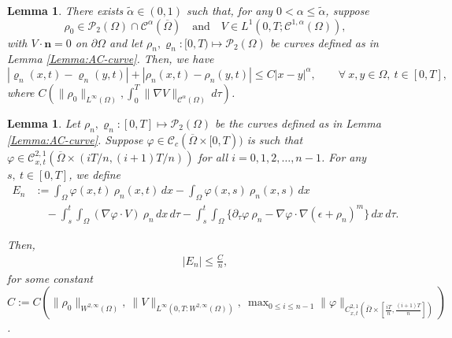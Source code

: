 \documentclass{amsart}
\newtheorem{lemma}[defn]{Lemma}
\numberwithin{equation}{section}
\newcommand{\calC}{{ \mathcal C  }}
\begin{document}
\begin{lemma}\label{Lemma : equi-continuity}\cite[Lemma 5.7]{HKK02}
There exists $\tilde{\alpha} \in (0,1)$ such that, for any $0<\alpha \leq\tilde{\alpha}$, suppose 
\begin{equation*}
\rho_0 \in \mathcal{P}_{2}(\Omega) \cap \calC^\alpha (\overline{\Omega})  \quad
\mbox{and} \quad V \in  L^1(0,T ; \calC^{1, \alpha}(\Omega)),
\end{equation*}
with  $V\cdot\mathbf{n}=0$ on $\partial \Omega$ and let $\rho_n,\varrho_n:[0,T)\mapsto \mathcal{P}_{2}(\Omega)$ be curves
defined as in Lemma \ref{Lemma:AC-curve}.
Then, we have
 \begin{equation*}\label{eq 2 : Holder of splitting}
|\varrho_n(x,t)-\varrho_n(y,t)| + |\rho_n(x,t)-\rho_n(y,t)|\leq
C|x-y|^\alpha,  \qquad \forall ~ x, y \in \Omega , ~ t \in [0, T],
 \end{equation*}
  where $C(\|\rho_0\|_{L^\infty(\Omega)},  \int_0^T \|\nabla V\|_{\calC^\alpha (\Omega)}  \,d\tau)$.
\end{lemma}


\begin{lemma}\label{Lemma:solving ODE}
Let $\rho_n,\varrho_n:[0,T]\mapsto \mathcal{P}_{2}(\Omega)$ be the curves defined as in Lemma \ref{Lemma:AC-curve}. 
Suppose $\varphi \in \calC_c(\overline{\Omega} \times [0,T))$ is such that   $\varphi \in \calC^{2,1}_{x,t}(\overline{\Omega} \times (iT/n, (i+1)T/n))$ for all $i=0, 1, 2, \dots, n-1$. 
For any $s,~t \in [0,T]$, we define 
\begin{equation}\label{eq 15 : solving ODE}
\begin{aligned}
E_n &:= \int_{\Omega}\varphi(x,t) ~\rho_n(x,t)\,dx - \int_{\Omega}\varphi(x,s) ~\rho_n(x,s)\,dx\\
  &\quad  - \int_{s}^{t} \int_{\Omega}  ( \nabla   \varphi \cdot V) ~\rho_n \,dx \,d\tau
  - \int_{s}^{t} \int_{\Omega}  \{ \partial_\tau \varphi ~ \rho_n - \nabla \varphi
\cdot \nabla (\epsilon +\rho_n)^m \}\,dx \,d\tau.
\end{aligned}
\end{equation}

Then,
\begin{equation}\label{eq 14 : solving ODE}
\begin{aligned}
|E_n| \leq  \frac{C}{n},
\end{aligned}
\end{equation}
for some constant  $C:=C (\|\rho_0\|_{W^{2,\infty}(\Omega)},  ~\|V\|_{L^\infty(0,T: W^{2,\infty}(\Omega))}, ~\max_{0\leq i\leq n-1} \|\varphi\|_{C^{2,1}_{x,t}(\bar{\Omega} \times [\frac{iT}{n}, \frac{(i+1)T}{n}])} )$.
\end{lemma}
\end{document}
